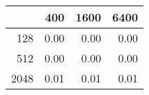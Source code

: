\begin{table}[ht]
\centering
\begin{tabular}{rrrr}
  \hline
 & 400 & 1600 & 6400 \\ 
  \hline
128 & 0.00 & 0.00 & 0.00 \\ 
  512 & 0.00 & 0.00 & 0.00 \\ 
  2048 & 0.01 & 0.01 & 0.01 \\ 
   \hline
\end{tabular}
\end{table}
